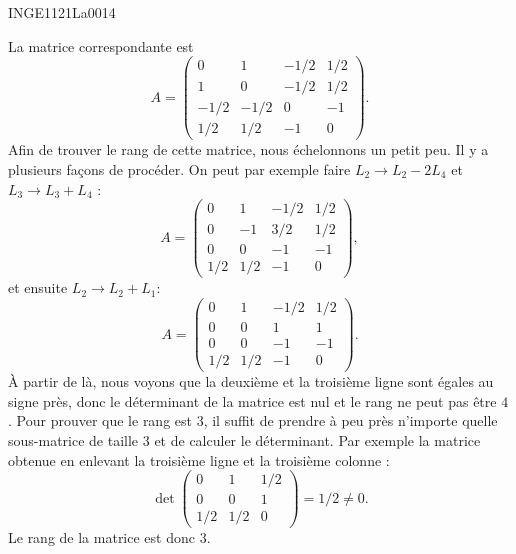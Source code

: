 

\begin{corrige}{INGE1121La0014}

	La matrice correspondante est 
	\begin{equation}
		A=
		\begin{pmatrix}
			 0	&	1	&	-1/2	&	1/2	\\
			 1	&	0	&	-1/2	&	1/2	\\
			 -1/2	&	-1/2	&	0	&	-1	\\ 
			 1/2	&	1/2	&	-1	&	0	 
		 \end{pmatrix}.
	\end{equation}
	Afin de trouver le rang de cette matrice, nous échelonnons un petit peu. Il y a plusieurs façons de procéder. On peut par exemple faire $L_2\to L_2-2L_4$ et $L_3\to L_3+L_4$ :
	\begin{equation}
		A=
		\begin{pmatrix}
			 0	&	1	&	-1/2	&	1/2	\\
			 0	&	-1	&	3/2	&	1/2	\\
			 0	&	0	&	-1	&	-1	\\ 
			 1/2	&	1/2	&	-1	&	0	 
		 \end{pmatrix},
	\end{equation}
	et ensuite $L_2\to L_2+L_1$:
	\begin{equation}
		A=
		\begin{pmatrix}
			 0	&	1	&	-1/2	&	1/2	\\
			 0	&	0	&	1	&	1	\\
			 0	&	0	&	-1	&	-1	\\ 
			 1/2	&	1/2	&	-1	&	0	 
		 \end{pmatrix}.
	\end{equation}
	À partir de là, nous voyons que la deuxième et la troisième ligne sont égales au signe près, donc le déterminant de la matrice est nul et le rang ne peut pas être $4$. Pour prouver que le rang est $3$, il suffit de prendre à peu près n'importe quelle sous-matrice de taille $3$ et de calculer le déterminant. Par exemple la matrice obtenue en enlevant la troisième ligne et la troisième colonne :
	\begin{equation}
		\det\begin{pmatrix}
			0	&	1	&	1/2	\\
			0	&	0	&	1	\\
			1/2	&	1/2	&	0
		\end{pmatrix}=1/2\neq 0.
	\end{equation}
	Le rang de la matrice est donc $3$. 


\end{corrige}

